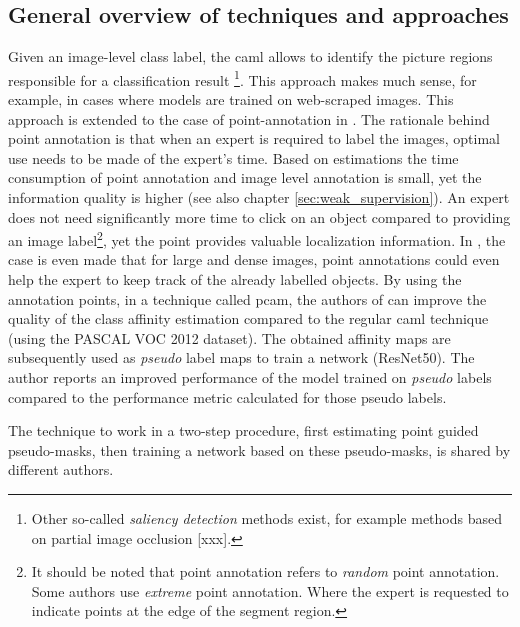 \subsection{General overview of techniques and approaches}
\par{
    Given an image-level class label, the \Gls{caml}  allows to identify the picture regions responsible for a classification result \cite{Ahn2018, Ahn2019}
    \footnote{Other so-called \textit{saliency detection} methods exist, for example methods based on partial image occlusion [xxx].}.
    This approach makes much sense, for example, in cases where models are trained on web-scraped images.
    This approach is extended to the case of point-annotation in \cite{McEver2020}. 
    The rationale behind point annotation is that when an expert is required to label the images, optimal use needs to be made of the expert's time.
    Based on estimations \cite{Bearman2015} the time consumption of point annotation and image level annotation is small, yet the information quality is higher (see also chapter \ref{sec:weak_supervision}).
    An expert does not need significantly more time to click on an object compared to providing an image label\footnote{
        It should be noted that point annotation refers to \textit{random} point annotation. Some authors \cite{Mainis} use \textit{extreme} point annotation. 
        Where the expert is requested to indicate points at the edge of the segment region.
    }, yet the point provides valuable localization information.
    In \cite{McEver2020}, the case is even made that for large and dense images, point annotations could even help the expert to keep track of the already labelled objects.
    By using the annotation points, in a technique called \acrfull{pcam}, the authors of \cite{McEver2020} can improve the quality of the class affinity estimation compared to the regular \Gls{caml} technique (using the PASCAL VOC 2012 dataset).
    The obtained affinity maps are subsequently used as \textit{pseudo} label maps to train a network (ResNet50). 
    The author reports an improved performance of the model trained on \textit{pseudo} labels compared to the performance metric calculated for those pseudo labels.
}
\par{
    The technique to work in a two-step procedure, first estimating point guided pseudo-masks, then training a network based on these pseudo-masks, is shared by different authors.
}
